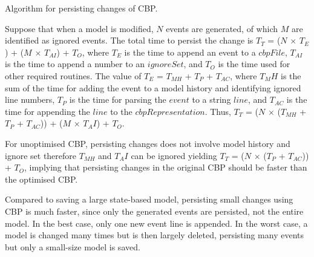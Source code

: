 \documentclass{llncs}
\begin{document}
    \begin{algorithm}[H]
        \begin{small}
        \end{small}
        \caption{Algorithm for persisting changes of CBP.}
        \label{alg:save}
    \end{algorithm}
    
    Suppose that when a model is modified,  $N$ events are generated, of which $M$ are identified as ignored events. The total time to persist the change is $T_T$ = ($N$ $\times$ $T_E$) + ($M$ $\times$ $T_{AI}$) + $T_O$, where $T_E$ is the time to append an event to a $cbpFile$, $T_{AI}$ is the time to append a number to an $ignoreSet$, and $T_O$ is the time used for other required routines. The value of $T_E$ = $T_{MH}$ + $T_P$ + $T_{AC}$, where $T_MH$ is the sum of the time for adding the event to a model history and identifying ignored line numbers, $T_P$ is the time for parsing the $event$ to a string $line$, and $T_{AC}$ is the time for appending the $line$ to the $cbpRepresentation$. Thus, $T_T$ = ($N$ $\times$ ($T_{MH}$ + $T_P$ + $T_{AC}$))  + ($M$ $\times$ $T_AI$) + $T_O$. 
    
    For unoptimised CBP, persisting changes does not involve model history and ignore set therefore $T_{MH}$ and $T_AI$ can be ignored yielding $T_T$ = ($N$ $\times$ ($T_P$ + $T_{AC}$)) + $T_O$, implying that persisting changes in the original CBP should be faster than the optimised CBP. 
    
    Compared to saving a large state-based model, persisting small changes using CBP is much faster, since only the generated events  are persisted, not the entire model. In the best case, only one new event line is appended. In the worst case, a model is changed many times but is then largely deleted, persisting many events but only a small-size model is saved. 
    
\end{document}

